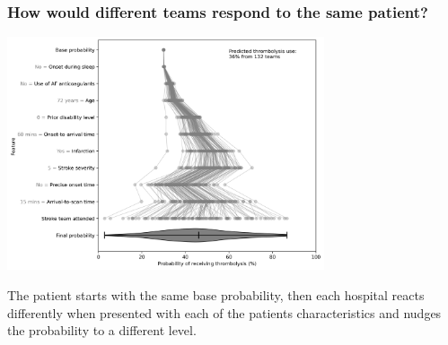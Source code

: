 \begin{frame}
\frametitle{How would different teams respond to the same patient?}

    \begin{center}
    \includegraphics[width=0.7\textwidth]{./images/21_shap_waterfall_with_violin_no_benchmark.jpg}
    \end{center}

\footnotesize The patient starts with the same base probability, then each hospital reacts differently when presented with each of the patients characteristics and nudges the probability to a different level.

\end{frame}
